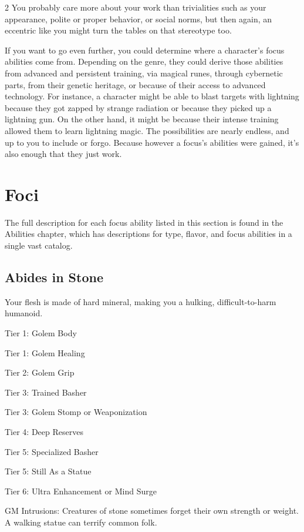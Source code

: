 \begin{multicols}{2}
You probably care more about your work than trivialities such as your appearance, polite or proper behavior, or social norms, but then again, an eccentric like you might turn the tables on that stereotype too.

If you want to go even further, you could determine where a character’s focus abilities come from. Depending on the genre, they could derive those abilities from advanced and persistent training, via magical runes, through cybernetic parts, from their genetic heritage, or because of their access to advanced technology. For instance, a character might be able to blast targets with lightning because they got zapped by strange radiation or because they picked up a lightning gun. On the other hand, it might be because their intense training allowed them to learn lightning magic. The possibilities are nearly endless, and up to you to include or forgo. Because however a focus’s abilities were gained, it’s also enough that they just work.

\section{Foci}

The full description for each focus ability listed in this section is found in the Abilities chapter, which has descriptions for type, flavor, and focus abilities in a single vast catalog.

\subsection{Abides in Stone}

Your flesh is made of hard mineral, making you a hulking, difficult-to-harm humanoid.

Tier 1: Golem Body

Tier 1: Golem Healing

Tier 2: Golem Grip

Tier 3: Trained Basher

Tier 3: Golem Stomp or Weaponization

Tier 4: Deep Reserves

Tier 5: Specialized Basher

Tier 5: Still As a Statue

Tier 6: Ultra Enhancement or Mind Surge

GM Intrusions: Creatures of stone sometimes forget their own strength or weight. A walking statue can terrify common folk.


\end{multicols}
